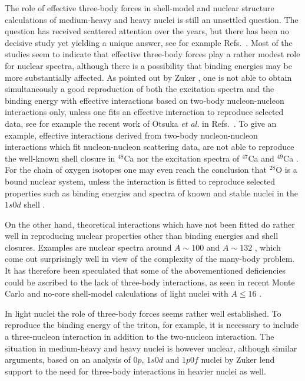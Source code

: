 \documentclass[prc,aps,amsmath,amssymb,preprintnumbers,showpacs,twocolumn]{revtex4}
\begin{document}
The role of effective three-body forces in shell-model and nuclear structure 
calculations of medium-heavy and heavy nuclei is still an unsettled question. 
The question has received scattered attention over the years, but there has 
been no decisive study yet yielding a unique answer, see for example 
Refs.~\cite{herbert1,herbert2,herbert3,dehmo04}. Most of the studies 
seem to indicate that effective three-body forces play a rather modest role 
for nuclear spectra, although there is a possibility that binding energies 
may be more substantially affected. As 
pointed out by Zuker \cite{zuker1}, one is not able to obtain 
simultaneously a good reproduction of both the excitation spectra and 
the binding energy with effective interactions
based on two-body nucleon-nucleon interactions only, 
unless one fits an effective interaction to reproduce selected data, 
see for example the recent work of Otsuka {\em et al.} in 
Refs.~\cite{taka1,taka2}. To give an example, effective
interactions derived from two-body nucleon-nucleon interactions which fit 
nucleon-nucleon scattering data, are not able to reproduce the 
well-known shell closure   %
in $^{48}$Ca nor     %
the excitation spectra of $^{47}$Ca and 
$^{49}$Ca \cite{zuker1,alex,oslo}. For the chain of oxygen 
isotopes one may even reach the conclusion that $^{28}$O is a bound 
nuclear system, unless  
the interaction is fitted to reproduce selected properties such
as binding energies and spectra 
of known and stable nuclei in the $1s0d$ shell \cite{alex}.  

On the other hand, theoretical interactions which have not been fitted 
do rather well in reproducing nuclear properties other than %
binding energies and shell closures.
Examples are nuclear spectra around $A\sim 100$ and $A\sim 132$
\cite{matej1,matej2,matej3,torgeir,jo,anne}, 
which come out surprisingly well in view of the 
complexity of the many-body problem. 
It has therefore been speculated that some of the abovementioned  deficiencies 
could be ascribed to the lack of three-body interactions, as seen in recent
Monte Carlo and no-core shell-model calculations of light nuclei with $A\le 16$
\cite{bob1,bob2,bob3,petr_erich2002,petr_erich2003}. 

In light nuclei the role of 
three-body forces seems rather well 
established. To reproduce the binding energy of the triton, for example, 
it is necessary to include a three-nucleon interaction in addition to 
the two-nucleon interaction. The situation in medium-heavy 
and heavy nuclei is however unclear, although similar arguments,
based on an analysis of $0p$, $1s0d$ and $1p0f$ nuclei by Zuker \cite{zuker1} 
lend support to the need for three-body interactions in  %
heavier nuclei as well.
\end{document}

